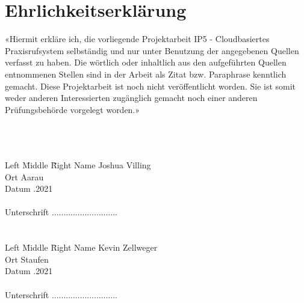 \section{Ehrlichkeitserklärung}

«Hiermit erkläre ich, die vorliegende Projektarbeit IP5 - Cloudbasiertes Praxisrufsystem selbständig und nur unter Benutzung der angegebenen Quellen verfasst zu haben.
Die wörtlich oder inhaltlich aus den aufgeführten Quellen entnommenen Stellen sind in der Arbeit als Zitat bzw. Paraphrase kenntlich gemacht.
Diese Projektarbeit ist noch nicht veröffentlicht worden.
Sie ist somit weder anderen Interessierten zugänglich gemacht noch einer anderen Prüfungsbehörde vorgelegt worden.»

\begin{tabbing}
    \\
    \\
    \\
    Left \= Middle \=  \= Right \kill
    Name \> \> \>    Joshua Villing\\
    Ort \> \> \>    Aarau \\
    Datum \> \> .2021\\
    \\
    Unterschrift \> \> \>     ............................\\
    \\
    \\
    Left \= Middle \= Right \kill
    Name \> \> \>    Kevin Zellweger\\
    Ort \> \>\>    Staufen\\
    Datum \> \> .2021\\
    \\
    Unterschrift \> \> \>    ............................\\
\end{tabbing}

